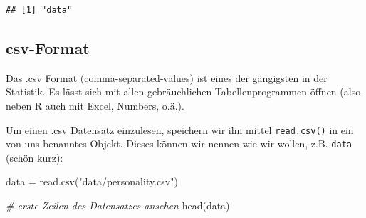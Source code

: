 \documentclass[
]{book}
\newenvironment{Shaded}{\begin{snugshade}}{\end{snugshade}}
\newcommand{\CommentTok}[1]{\textcolor[rgb]{0.56,0.35,0.01}{\textit{#1}}}
\newcommand{\FunctionTok}[1]{\textcolor[rgb]{0.00,0.00,0.00}{#1}}
\newcommand{\NormalTok}[1]{#1}
\newcommand{\OtherTok}[1]{\textcolor[rgb]{0.56,0.35,0.01}{#1}}
\newcommand{\StringTok}[1]{\textcolor[rgb]{0.31,0.60,0.02}{#1}}
\begin{document}
\begin{verbatim}
## [1] "data"
\end{verbatim}

\hypertarget{csv-format}{%
\subsection{csv-Format}\label{csv-format}}

Das .csv Format (comma-separated-values) ist eines der gängigsten in der Statistik. Es lässt sich mit allen gebräuchlichen Tabellenprogrammen öffnen (also neben R auch mit Excel, Numbers, o.ä.).

Um einen .csv Datensatz einzulesen, speichern wir ihn mittel \texttt{read.csv()} in ein von uns benanntes Objekt. Dieses können wir nennen wie wir wollen, z.B. \texttt{data} (schön kurz):

\begin{Shaded}
\begin{Highlighting}[]
\NormalTok{data }\OtherTok{=} \FunctionTok{read.csv}\NormalTok{(}\StringTok{"data/personality.csv"}\NormalTok{)}

\CommentTok{\# erste Zeilen des Datensatzes ansehen}
\FunctionTok{head}\NormalTok{(data)}
\end{Highlighting}
\end{Shaded}
\end{document}
